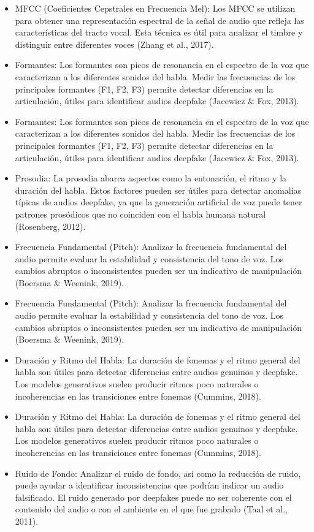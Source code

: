 \begin{itemize}
	\item MFCC (Coeficientes Cepstrales en Frecuencia Mel): Los MFCC se utilizan para obtener una representación espectral de la señal de audio que refleja las características del tracto vocal. Esta técnica es útil para analizar el timbre y distinguir entre diferentes voces (Zhang et al., 2017).
	\item Formantes: Los formantes son picos de resonancia en el espectro de la voz que caracterizan a los diferentes sonidos del habla. Medir las frecuencias de los principales formantes (F1, F2, F3) permite detectar diferencias en la articulación, útiles para identificar audios deepfake (Jacewicz \& Fox, 2013).
	\item Formantes: Los formantes son picos de resonancia en el espectro de la voz que caracterizan a los diferentes sonidos del habla. Medir las frecuencias de los principales formantes (F1, F2, F3) permite detectar diferencias en la articulación, útiles para identificar audios deepfake (Jacewicz \& Fox, 2013).
	\item Prosodia: La prosodia abarca aspectos como la entonación, el ritmo y la duración del habla. Estos factores pueden ser útiles para detectar anomalías típicas de audios deepfake, ya que la generación artificial de voz puede tener patrones prosódicos que no coinciden con el habla humana natural (Rosenberg, 2012).
	\item Frecuencia Fundamental (Pitch): Analizar la frecuencia fundamental del audio permite evaluar la estabilidad y consistencia del tono de voz. Los cambios abruptos o inconsistentes pueden ser un indicativo de manipulación (Boersma \& Weenink, 2019).
	\item Frecuencia Fundamental (Pitch): Analizar la frecuencia fundamental del audio permite evaluar la estabilidad y consistencia del tono de voz. Los cambios abruptos o inconsistentes pueden ser un indicativo de manipulación (Boersma \& Weenink, 2019).
	\item Duración y Ritmo del Habla: La duración de fonemas y el ritmo general del habla son útiles para detectar diferencias entre audios genuinos y deepfake. Los modelos generativos suelen producir ritmos poco naturales o incoherencias en las transiciones entre fonemas (Cummins, 2018).
	\item Duración y Ritmo del Habla: La duración de fonemas y el ritmo general del habla son útiles para detectar diferencias entre audios genuinos y deepfake. Los modelos generativos suelen producir ritmos poco naturales o incoherencias en las transiciones entre fonemas (Cummins, 2018).
	\item Ruido de Fondo: Analizar el ruido de fondo, así como la reducción de ruido, puede ayudar a identificar inconsistencias que podrían indicar un audio falsificado. El ruido generado por deepfakes puede no ser coherente con el contenido del audio o con el ambiente en el que fue grabado (Taal et al., 2011).
\end{itemize}


